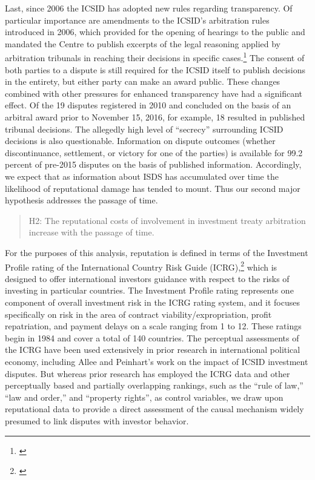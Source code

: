 \documentclass[12pt,onesided]{amsart}
\begin{document}
Last, since 2006 the ICSID has adopted new rules regarding transparency. Of particular importance are amendments to the ICSID's arbitration rules introduced in 2006, which provided for the opening of hearings to the public and mandated the Centre to publish excerpts of the legal reasoning applied by arbitration tribunals in reaching their decisions in specific cases.\footnote{\citet{antonietti:2006,yackee20112006}} The consent of both parties to a dispute is still required for the ICSID itself to publish decisions in the entirety, but either party can make an award public. These changes combined with other pressures for enhanced transparency have had a significant effect. Of the 19 disputes registered in 2010 and concluded on the basis of an arbitral award prior to November 15, 2016, for example, 18 resulted in published tribunal decisions. The allegedly high level of ``secrecy'' surrounding ICSID decisions is also questionable. Information on dispute outcomes (whether discontinuance, settlement, or victory for one of the parties) is available for 99.2 percent of pre-2015 disputes on the basis of published information. Accordingly, we expect that as information about ISDS has accumulated over time the likelihood of reputational damage has tended to mount. Thus our second major hypothesis addresses the passage of time. 

\begin{quote}
H2: The reputational costs of involvement in investment treaty arbitration increase with the passage of time.
\end{quote}

For the purposes of this analysis, reputation is defined in terms of the Investment Profile rating of the International Country Risk Guide (ICRG),\footnote{\citet{prs:2013}} which is designed to offer international investors guidance with respect to the risks of investing in particular countries. The Investment Profile rating represents one component of overall investment risk in the ICRG rating system, and it focuses specifically on risk in the area of contract viability/expropriation, profit repatriation, and payment delays on a scale ranging from 1 to 12. These ratings begin in 1984 and cover a total of 140 countries. The perceptual assessments of the ICRG have been used extensively in prior research in international political economy, including Allee and Peinhart's work on the impact of ICSID investment disputes. But whereas prior research has employed the ICRG data and other perceptually based and partially overlapping rankings, such as the ``rule of law,'' ``law and order,'' and ``property rights'', as control variables, we draw upon reputational data to provide a direct assessment of the causal mechanism widely presumed to link disputes with investor behavior.
\end{document}
